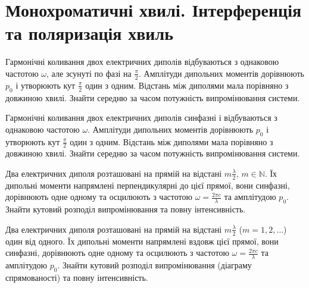 \section{Монохроматичні хвилі. Інтерференція та поляризація хвиль}


\begin{problem}
Гармонічні коливання двох електричних диполів відбуваються з однаковою частотою $\omega$, але зсунуті по фазі на $\frac{\pi}{2}$. Амплітуди дипольних моментів дорівнюють $p_0$ і утворюють кут $\frac{\pi}{2}$ один з одним. Відстань між диполями мала порівняно з довжиною хвилі. Знайти середню за часом потужність випромінювання системи.
\end{problem}

\begin{problem}
Гармонічні коливання двох електричних диполів синфазні і відбуваються з однаковою частотою $\omega$. Амплітуди дипольних моментів дорівнюють $p_0$ і утворюють кут $\frac{\pi}{2}$ один з одним. Відстань між диполями мала порівняно з довжиною хвилі. Знайти середню за часом потужність випромінювання системи.
\end{problem}

\begin{problem}
Два електричних диполя розташовані на прямій на відстані $m\frac{\lambda}{2}$, $m \in \mathbb{N}$. Їх дипольні моменти напрямлені перпендикулярні до цієї прямої, вони синфазні, дорівнюють одне одному та осцилюють з частотою $\omega  = \frac{2\pi c}{\lambda}$ та амплітудою $p_0$. Знайти кутовий розподіл випромінювання та повну інтенсивність.
\end{problem}


\begin{problem}
Два електричних диполя розташовані на прямій на відстані $m\frac\lambda2$ ($m = 1,2, \ldots$) один від одного. Їх дипольні моменти напрямлені вздовж
цієї прямої, вони синфазні, дорівнюють одне одному та осцилюють з частотою $\omega = \frac{2\pi c}{\lambda}$ та амплітудою $p_0$. Знайти кутовий
розподіл випромінювання (діаграму спрямованості) та повну інтенсивність.
\end{problem}


